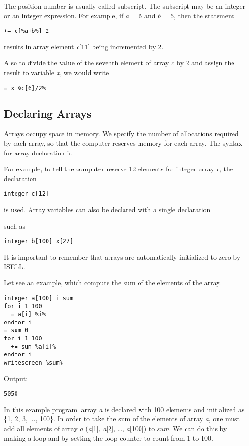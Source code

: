 \documentclass[a4paper,12pt]{book}
\begin{document}
The position number is usually called subscript. The subscript may be an integer or an
integer expression. For example, if \textsl{a} = 5 and \textsl{b} = 6, then the statement
\begin{verbatim}
+= c[%a+b%] 2
\end{verbatim}
results in array element \textsl{c}[11] being incremented by 2.

Also to divide the value of the seventh element of array \textsl{c} by 2 and assign the result to variable \textsl{x},
we would write
\begin{verbatim}
= x %c[6]/2%
\end{verbatim}

\subsection{Declaring Arrays}
Arrays occupy space in memory. We specify the number of allocations required by each array, so that the
computer reserves memory for each array. The syntax for array declaration is
\begin{center}
\end{center}
For example, to tell the computer reserve 12 elements for integer array \textsl{c}, the
declaration
\begin{verbatim}
integer c[12]
\end{verbatim}
is used. Array variables can also be declared with a single declaration 
\begin{center}
\end{center}
such as
\begin{verbatim}
integer b[100] x[27]
\end{verbatim}
It is important to remember that arrays are automatically initialized to zero by ISELL. 

Let see an example, which compute the sum of the elements of the array.
\begin{verbatim}
integer a[100] i sum
for i 1 100
  = a[i] %i%
endfor i
= sum 0
for i 1 100
  += sum %a[i]%
endfor i
writescreen %sum%
\end{verbatim}
\noindent
Output:
\begin{verbatim}
5050
\end{verbatim}
In this example program, array \textsl{a} is declared with 100 elements and initialized as \{1, 2, 3, $\ldots$, 100\}. In order to take the sum of the elements of array \textsl{a}, one must add all elements of array \textsl{a} (\textsl{a}[1], \textsl{a}[2], \ldots, \textsl{a}[100]) to \textsl{sum}. We can do this by making a loop and by setting the loop counter to count from 1 to 100.
\end{document}
